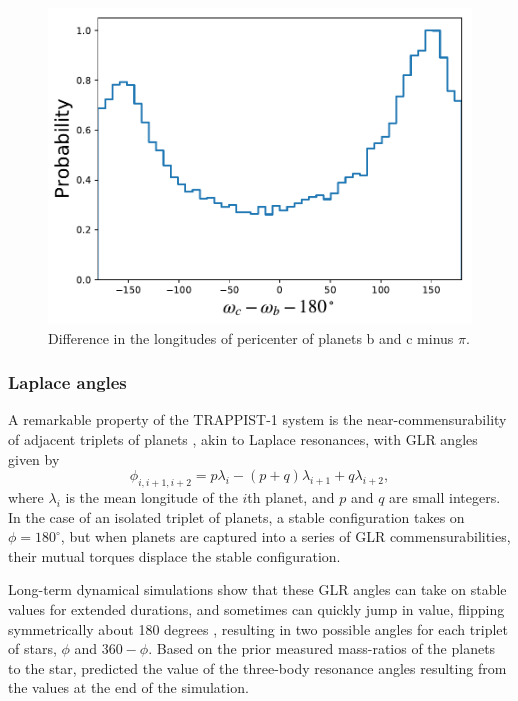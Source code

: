 \documentclass[twocolumn]{aastex63}
\begin{document}
\begin{figure}
    \centering
    \includegraphics[width=\hsize]{figures/delta_omega_bc.pdf}
    \caption{Difference in the longitudes of pericenter of planets b and
    c minus $\pi$.}
    \label{fig:delta_omega}
\end{figure}

\subsubsection{Laplace angles}

A remarkable property of the TRAPPIST-1 system is the near-commensurability
of adjacent triplets of planets \citep{Luger2017b}, akin to Laplace resonances, with
GLR angles given by
\begin{equation}
    \phi_{i,i+1,i+2} = p \lambda_i - (p+q) \lambda_{i+1} + q \lambda_{i+2},
\end{equation}
where $\lambda_i$ is the mean longitude of the $i$th planet, and $p$ and
$q$ are small integers.  In
the case of an isolated triplet of planets, a stable configuration takes
on $\phi = 180^\circ$, but when planets are captured into a series of GLR
commensurabilities, their mutual torques displace the stable configuration.

Long-term
dynamical simulations show that these GLR angles can take on stable values
for extended durations, and sometimes can quickly jump in value, flipping symmetrically about 
180 degrees \citep{Mah2018},
resulting in two possible angles for each triplet of stars, $\phi$ and $360-\phi$.
Based on the prior measured mass-ratios of the planets to the star, \citet{Mah2018}
predicted the value of the three-body resonance angles resulting from the values at the
end of the simulation.  
\end{document}
